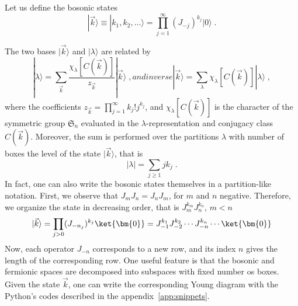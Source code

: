 Let us define the bosonic states
\begin{equation}
|\vec{k}\rangle \equiv |k_1, k_2, \dots \rangle = \prod_{j=1}^{\infty}
(J_{-j})^{k_j}|0\rangle\; .
\end{equation}

The two bases \(|\vec{k}\rangle\) and
\(|\lambda\rangle\) are related by~\cite{Marino:2005sj}
\begin{subequations}
\begin{equation}
|\lambda\rangle = \sum_{\vec{k}}
\frac{\chi_\lambda[C(\vec{k})]}{z_{\vec{k}}} |\vec{k}\rangle\; ,
\end{equation}
and inverse 
\begin{equation}
|\vec{k}\rangle = \sum_{\lambda} \chi_\lambda[C(\vec{k})]
|\lambda\rangle \; ,
\end{equation}
\end{subequations}
where the coefficients \(z_{\vec{k}} = \prod_{j=1}^\infty k_j!
j^{k_j}\), and \(\chi_\lambda[C(\vec{k})]\) is the character of the
symmetric group \(\mathfrak{S}_n\) evaluated in the
\(\lambda\)-representation and conjugacy class
\(C(\vec{k})\). Moreover, the sum is performed over the partitions
\(\lambda\) with number of boxes the level of the state
\(|\vec{k}\rangle\), that is
\begin{equation}
|\lambda|= \sum_{j\geq 1} j k_j\; . 
\end{equation}
In fact, one can also write the bosonic states themselves in a
partition-like notation. First, we observe that \(J_m J_n = J_n J_m\),
for \(m\) and \(n\) negative. Therefore, we organize the state
in decreasing order, that is \(J_m^{k_m} J_n^{k_n}\), \(m<n\)
\begin{equation}
  |\vec{k}\rangle = \prod_{j>0}(J_{-n_j})^{k_j}\ket{\bm{0}} =
J_{-1}^{k_1} J_{-2}^{k_2} \cdots J_{-n}^{k_n}\cdots \ket{\bm{0}} 
\end{equation}
Now, each operator \(J_{-n}\) corresponds to a new row, and its index
\(n\) gives the length of the corresponding row. One useful feature is
that the bosonic and fermionic spaces are decomposed into subspaces
with fixed number os boxes.
Given the state \(\vec{k}\), one can write
the corresponding Young diagram with the Python's codes described in
the appendix~\ref{app:snippets}.

